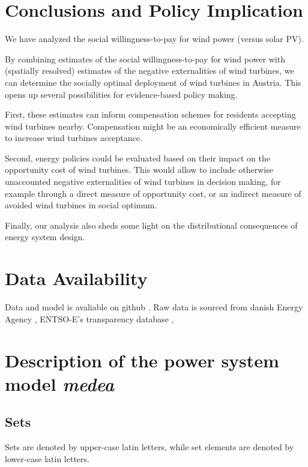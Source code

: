\documentclass[review, 3p, times]{elsarticle} %
\begin{document}
    \section{Conclusions and Policy Implication} \label{sec:conclusions-policy-implication}
    We have analyzed the social willingness-to-pay for wind power (versus solar PV).

    By combining estimates of the social willingness-to-pay for wind power with (spatially resolved) estimates of the negative externalities of wind turbines, we can determine the socially optimal deployment of wind turbines in Austria.
    This opens up several possibilities for evidence-based policy making.

    First, these estimates can inform compensation schemes for residents accepting wind turbines nearby.
    Compensation might be an economically efficient measure to increase wind turbines acceptance.

    Second, energy policies could be evaluated based on their impact on the opportunity cost of wind turbines.
    This would allow to include otherwise unaccounted negative externalities of wind turbines in decision making, for example through a direct measure of opportunity cost, or an indirect measure of avoided wind turbines in social optimum.

    Finally, our analysis also sheds some light on the distributional consequences of energy system design.


    \section{Data Availability}\label{sec:data-availability}
    Data and model is avaliable on github \url{}. Raw data is sourced from danish Energy Agency \url{}, ENTSO-E's
    transparency database \url{},

    \newpage
    
    

    \newpage
    \appendix


    \section{Description of the power system model \emph{medea}} \label{sec:medea}

\subsection{Sets} \label{sets}
Sets are denoted by upper-case latin letters, while set elements are denoted by lower-case latin letters.
\end{document}
